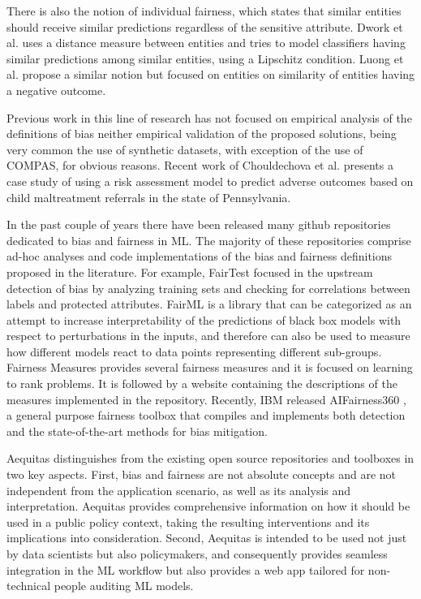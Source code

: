 There is also the notion of individual fairness, which states that similar entities should receive similar predictions regardless of the sensitive attribute. Dwork et al. uses a distance measure between entities and tries to model classifiers having similar predictions among similar entities, using a Lipschitz condition. Luong et al. \cite{luong2011k} propose a similar notion but focused on entities on similarity of entities having a negative outcome.

Previous work in this line of research has not focused on empirical analysis of the definitions of bias neither empirical validation of the proposed solutions, being very common the use of synthetic datasets, with exception of the use of COMPAS, for obvious reasons. Recent work of Chouldechova et al. \cite{chouldechova2018case} presents a case study of using a risk assessment model to predict adverse outcomes based on child maltreatment referrals in the state of Pennsylvania. 

In the past couple of years there have been released many github repositories dedicated to bias and fairness in ML. The majority of these repositories comprise ad-hoc analyses and code implementations of the bias and fairness definitions proposed in the literature. For example, FairTest \cite{tramer2017fairtest} focused in the upstream detection of bias by analyzing training sets and checking for correlations between labels and protected attributes. FairML \cite{adebayo2016} is a library that can be categorized as an attempt to increase interpretability of the predictions of black box models with respect to perturbations in the inputs, and therefore can also be used to measure how different models react to data points representing different sub-groups. Fairness Measures \cite{zehlike2017} provides several fairness measures and it is focused on learning to rank problems. It is followed by a website containing the descriptions of the measures implemented in the repository. Recently, IBM released AIFairness360 \cite{bellamy2018ai}, a general purpose fairness toolbox that compiles and implements both detection and the state-of-the-art methods for bias mitigation. 

Aequitas distinguishes from the existing open source repositories and toolboxes in two key aspects. First, bias and fairness are not absolute concepts and are not independent from the application scenario, as well as its analysis and interpretation. Aequitas provides comprehensive information on how it should be used in a public policy context, taking the resulting interventions and its implications into consideration. Second, Aequitas is intended to be used not just by data scientists but also policymakers, and consequently provides seamless integration in the ML workflow but also provides a web app tailored for non-technical people auditing ML models.






